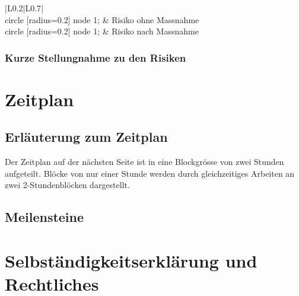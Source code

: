 \begin{table}[H]
    \begin{tabular}{|L{0.2\textwidth}|L{0.7\textwidth}|}
        \hline
         \\
        \hline
        \tikz\draw[black,fill=white] circle [radius=0.2] node {1}; & Risiko ohne Massnahme \\
        \hline
        \tikz\draw[black,fill=gray] circle [radius=0.2] node {1}; & Risiko nach Massnahme \\
        \hline
    \end{tabular}
    \caption{Riskiomatrix Legende}
\end{table}

\subsection{Kurze Stellungnahme zu den Risiken}

\chapter{Zeitplan}


\section{Erläuterung zum Zeitplan}
Der Zeitplan auf der nächsten Seite ist in eine Blockgrösse von zwei Stunden aufgeteilt. Blöcke von nur einer Stunde werden durch gleichzeitiges Arbeiten an zwei 2-Stundenblöcken dargestellt.


\section{Meilensteine}


\chapter{Selbständigkeitserklärung und Rechtliches}
